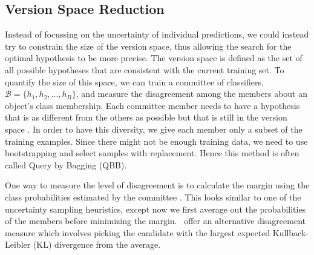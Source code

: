 \documentclass[fleqn,10pt,lineno]{wlpeerj} %
\newcommand{\B}{\mathcal{B}}
\begin{document}
\subsection{Version Space Reduction}

Instead of focussing on the uncertainty of individual predictions, we could
instead try to constrain the size of the version space, thus allowing the
search for the optimal hypothesis to be more precise. The version space is
defined as the set of all possible hypotheses that are consistent with the
current training set. To quantify the size of this space, we can train a
committee of classifiers, $\B = \{h_1, h_2, ..., h_B\}$, and measure the
disagreement among the members about an object's class membership. Each
committee member needs to have a hypothesis that is as different from the
others as possible but that is still in the version space \citep{melville04}.
In order to have this diversity, we give each member only a subset of the
training examples. Since there might not be enough training data, we need to
use bootstrapping and select samples with replacement. Hence this method is
often called Query by Bagging (QBB).

One way to measure the level of disagreement is to calculate the margin using
the class probabilities estimated by the committee \citep{melville04}. This
looks similar to one of the uncertainty sampling heuristics, except now we
first average out the probabilities of the members before minimizing the
margin.~\cite{mccallum98} offer an alternative disagreement measure which
involves picking the candidate with the largest expected Kullback-Leibler (KL)
divergence from the average.
\end{document}
